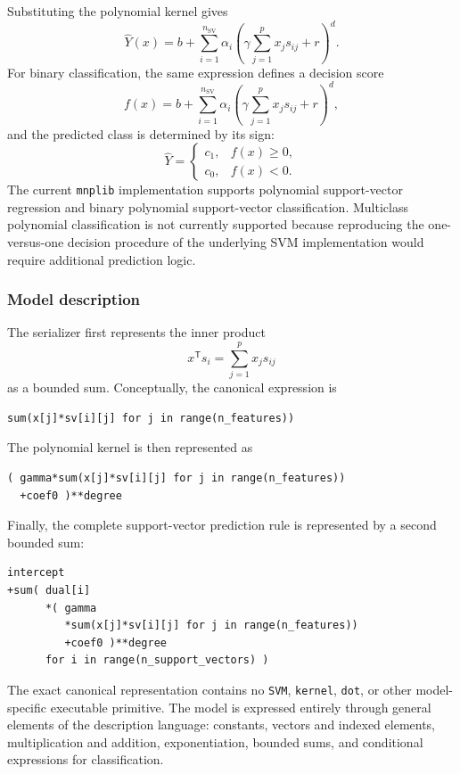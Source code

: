 Substituting the polynomial kernel gives
\[
\widehat{Y}(x) = b + \sum_{i=1}^{n_{\mathrm{SV}}} \alpha_i
\left(\gamma \sum_{j=1}^{p}x_j s_{ij} + r\right)^d.
\]
For binary classification, the same expression defines a decision score
\[
f(x) = b + \sum_{i=1}^{n_{\mathrm{SV}}} \alpha_i
\left(\gamma \sum_{j=1}^{p}x_j s_{ij} + r\right)^d,
\]
and the predicted class is determined by its sign:
\[
\widehat{Y} =
\begin{cases}
c_1, & f(x)\geq0,\\
c_0, & f(x)<0.
\end{cases}
\]
The current \texttt{mnplib} implementation supports polynomial support-vector regression and binary polynomial support-vector classification. Multiclass polynomial classification is not currently supported because reproducing the one-versus-one decision procedure of the underlying SVM implementation would require additional prediction logic.

\subsubsection{Model description}

The serializer first represents the inner product
\[
x^\mathsf{T}s_i = \sum_{j=1}^{p}x_j s_{ij}
\]
as a bounded sum. Conceptually, the canonical expression is

\begin{verbatim}
sum(x[j]*sv[i][j] for j in range(n_features))
\end{verbatim}

The polynomial kernel is then represented as

\begin{verbatim}
( gamma*sum(x[j]*sv[i][j] for j in range(n_features))
  +coef0 )**degree
\end{verbatim}

Finally, the complete support-vector prediction rule is represented by a second bounded sum:

\begin{verbatim}
intercept
+sum( dual[i]
      *( gamma
         *sum(x[j]*sv[i][j] for j in range(n_features))
         +coef0 )**degree
      for i in range(n_support_vectors) )
\end{verbatim}

The exact canonical representation contains no \texttt{SVM}, \texttt{kernel}, \texttt{dot}, or other model-specific executable primitive. The model is expressed entirely through general elements of the description
language: constants, vectors and indexed elements, multiplication and addition, exponentiation,  bounded sums, and conditional expressions for classification.

